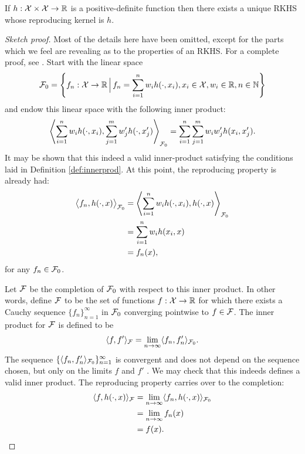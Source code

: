 \begin{theorem}
  If $h:{\mathcal X}\times{\mathcal X}\to\mathbb{R}$ is a positive-definite function then there exists a unique RKHS whose reproducing kernel is $h$.
\end{theorem}

\begin{proof}[Sketch proof]
  Most of the details here have been omitted, except for the parts which we feel are revealing as to the properties of an RKHS.
  For a complete proof, see \citet{berlinet2011reproducing}. 
  Start with the linear space
  \[
    {\mathcal F}_0 = \left\{ f_n:{\mathcal X}\to\mathbb{R} \, \Big| \, f_n = \sum_{i=1}^n w_i h(\cdot,x_i), x_i\in{\mathcal X}, w_i\in\mathbb{R}, n\in\mathbb{N} \right\}
  \]
  and endow this linear space with the following inner product:
  \[\label{eq:rkhsinnerprod}
    \left\langle \sum_{i=1}^n w_i h(\cdot,x_i), \sum_{j=1}^m w_j' h(\cdot,x_j') \right\rangle_{{\mathcal F}_0} = \sum_{i=1}^n\sum_{j=1}^m w_i w_j' h(x_i,x_j').
  \]
  It may be shown that this indeed a valid inner-product satisfying the conditions laid in Definition \ref{def:innerprod}.
  At this point, the reproducing property is already had:
  \begin{align*}
    \big\langle f_n, h(\cdot,x) \big\rangle_{{\mathcal F}_0} 
    &= \left\langle \sum_{i=1}^n w_i h(\cdot,x_i), h(\cdot,x) \right\rangle_{{\mathcal F}_0} \\
    &= \sum_{i=1}^n w_i h(x_i,x) \\
    &= f_n(x),
  \end{align*}
  for any $f_n\in{\mathcal F}_0$.
  
  Let ${\mathcal F}$ be the completion of ${\mathcal F}_0$ with respect to this inner product.
  In other words, define ${\mathcal F}$ to be the set of functions $f:{\mathcal X}\to\mathbb{R}$ for which there exists a Cauchy sequence $\{f_n\}_{n=1}^\infty$ in ${\mathcal F}_0$ converging pointwise to $f \in {\mathcal F}$.
  The inner product for ${\mathcal F}$ is defined to be
  \[
    \langle f,f'\rangle_{\mathcal F} = \lim_{n\to\infty} \langle f_n,f_n'\rangle_{{\mathcal F}_0}.
  \]
  The sequence $\{ \langle f_n,f_n'\rangle_{{\mathcal F}_0} \}_{n=1}^\infty$ is convergent and does not depend on the sequence chosen, but only on the limits $f$ and $f'$ \citep[Lemma 5]{berlinet2011reproducing}.
  We may check that this indeeds defines a valid inner product.
  The reproducing property carries over to the completion:
  \begin{align*}
    \langle f,h(\cdot,x)\rangle_{\mathcal F} 
    &= \lim_{n\to\infty} \langle f_n,h(\cdot,x)\rangle_{{\mathcal F}_0} \\
    &= \lim_{n\to\infty} f_n(x) \\
    &= f(x).
  \end{align*}
  

\end{proof}
